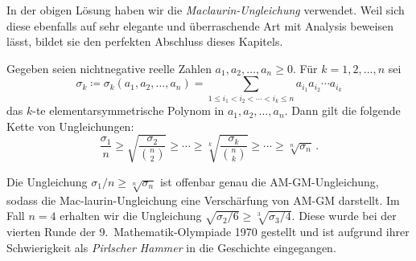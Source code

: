In der obigen Lösung haben wir die \emph{Maclaurin-Ungleichung} verwendet. Weil sich diese ebenfalls auf sehr elegante und überraschende Art mit Analysis beweisen lässt, bildet sie den perfekten Abschluss dieses Kapitels.
\begin{satzmitnamen}
	Gegeben seien nichtnegative reelle Zahlen $a_1,a_2,\dotsc,a_n\geqslant 0$. Für $k=1,2,\dotsc,n$ sei
	\begin{equation*}
		\sigma_k\coloneqq \sigma_k(a_1,a_2,\dotsc,a_n)= \sum_{1\leqslant i_1<i_2<\dotsb<i_k\leqslant n}a_{i_1}a_{i_2}\dotsm a_{i_k}
	\end{equation*}
	das $k$-te elementarsymmetrische Polynom in $a_1,a_2,\dotsc,a_n$. Dann gilt die folgende Kette von Ungleichungen:
	\begin{equation*}
		\frac{\sigma_1}{n}\geqslant\sqrt{\frac{\sigma_2}{\binom{n}{2}}}\geqslant \dotsb\geqslant \sqrt[k]{\frac{\sigma_k}{\binom{n}{k}}}\geqslant \dotsb\geqslant\sqrt[n]{\sigma_n}\,.
	\end{equation*}
\end{satzmitnamen}
Die Ungleichung $\sigma_1/n\geqslant \sqrt[n]{\sigma_n}$ ist offenbar genau die AM-GM-Ungleichung, sodass die Mac-laurin-Ungleichung eine Verschärfung von AM-GM darstellt. Im Fall $n=4$ erhalten wir die Ungleichung $\sqrt{\sigma_2/6}\geqslant \sqrt[3]{\sigma_3/4}$. Diese wurde bei der vierten Runde der 9.\ Mathematik-Olympiade 1970 gestellt und ist aufgrund ihrer Schwierigkeit als \emph{Pirlscher Hammer} in die Geschichte eingegangen.



